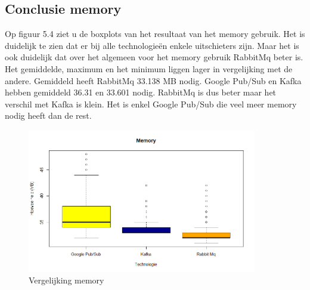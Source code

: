 \subsection{Conclusie memory}

Op figuur 5.4 ziet u de boxplots van het resultaat van het memory gebruik. Het is duidelijk te zien dat er bij alle technologieën enkele uitschieters zijn. Maar het is ook duidelijk dat over het algemeen voor het memory gebruik RabbitMq beter is. Het gemiddelde, maximum en het minimum liggen lager in vergelijking met de andere. Gemiddeld heeft RabbitMq 33.138 MB nodig. Google Pub/Sub en Kafka hebben gemiddeld 36.31 en 33.601 nodig. RabbitMq is dus beter maar het verschil met Kafka is klein. Het is enkel Google Pub/Sub die veel meer memory nodig heeft dan de rest.
\begin{figure}[h!]
    \centering
    \includegraphics[width=100mm]{../memory.png}
    \caption{Vergelijking memory}
    
\end{figure}


